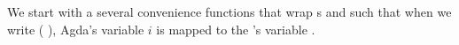 \begin{code}[hide]
\\
%
\>[2]\AgdaSpace{}%
\AgdaSymbol{:}\AgdaSpace{}%
\AgdaSymbol{(}\AgdaSpace{}%
\AgdaSymbol{(}\AgdaSpace{}%
\AgdaSpace{}%
\AgdaSpace{}%
\AgdaSymbol{)}\AgdaSpace{}%
\AgdaSymbol{(}\AgdaSpace{}%
\AgdaSymbol{)}\AgdaSpace{}%
\AgdaSpace{}%
\AgdaSpace{}%
\AgdaSymbol{(}\AgdaSpace{}%
\AgdaSpace{}%
\AgdaSpace{}%
\AgdaSymbol{)}\AgdaSpace{}%
\AgdaSymbol{(}\AgdaSpace{}%
\AgdaSymbol{))}\AgdaSpace{}%
\AgdaSpace{}%
\AgdaSpace{}%
\AgdaSpace{}%
\AgdaSymbol{(}\AgdaSpace{}%
\AgdaSymbol{(}\AgdaSpace{}%
\AgdaSpace{}%
\AgdaSymbol{))}\<%
\\
%
\>[2]\AgdaSpace{}%
\AgdaSymbol{:}\AgdaSpace{}%
\AgdaSymbol{(}\AgdaSpace{}%
\AgdaSymbol{(}\AgdaSpace{}%
\AgdaSpace{}%
\AgdaSpace{}%
\AgdaSymbol{)}\AgdaSpace{}%
\AgdaSymbol{(}\AgdaSpace{}%
\AgdaSymbol{)}\AgdaSpace{}%
\AgdaSpace{}%
\AgdaSpace{}%
\AgdaSymbol{(}\AgdaSpace{}%
\AgdaSpace{}%
\AgdaSpace{}%
\AgdaSymbol{)}\AgdaSpace{}%
\AgdaSymbol{(}\AgdaSpace{}%
\AgdaSymbol{))}\AgdaSpace{}%
\AgdaSpace{}%
\AgdaSpace{}%
\AgdaSpace{}%
\AgdaSymbol{(}\AgdaSpace{}%
\AgdaSymbol{)}\<%
\end{code}
We start with a several convenience functions that wrap s and 
such that when we write (    ), Agda's variable
$i$ is mapped to the 's variable .
